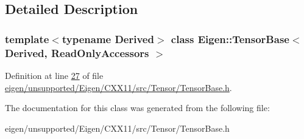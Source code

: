 \subsection{Detailed Description}
\subsubsection*{template$<$typename Derived$>$\newline
class Eigen\+::\+Tensor\+Base$<$ Derived, Read\+Only\+Accessors $>$}



Definition at line \hyperlink{eigen_2unsupported_2_eigen_2_c_x_x11_2src_2_tensor_2_tensor_base_8h_source_l00027}{27} of file \hyperlink{eigen_2unsupported_2_eigen_2_c_x_x11_2src_2_tensor_2_tensor_base_8h_source}{eigen/unsupported/\+Eigen/\+C\+X\+X11/src/\+Tensor/\+Tensor\+Base.\+h}.



The documentation for this class was generated from the following file\+:\begin{DoxyCompactItemize}
\item 
eigen/unsupported/\+Eigen/\+C\+X\+X11/src/\+Tensor/\+Tensor\+Base.\+h\end{DoxyCompactItemize}
